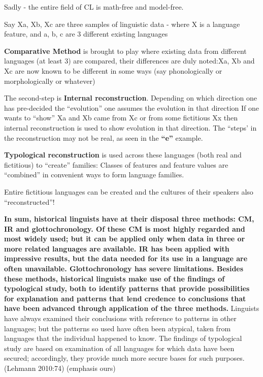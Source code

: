 Sadly - the entire field of CL is math-free and model-free.

Say Xa, Xb, Xc are three samples of linguistic data - where X is a language feature, and a, b, c are 3 different existing languages

\textbf{Comparative Method} is brought to play where existing data from different languages (at least 3) are compared, their differences are duly noted:Xa, Xb and Xc are now known to be different in some ways (say phonologically or morphologically or whatever)

The second-step is \textbf{Internal reconstruction}. Depending on which direction one has pre-decided the “evolution” one assumes the evolution in that direction If one wants to “show” Xa and Xb came from Xc or from some fictitious Xx then internal reconstruction is used to show evolution in that direction. The “steps’ in the reconstruction may not be real, as seen in the \textbf{“e”} example.

\textbf{Typological reconstruction} is used across these languages (both real and fictitious) to “create” families: Classes of features and feature values are “combined” in convenient ways to form language families.

Entire fictitious languages can be created and the cultures of their speakers also “reconstructed”!

\begin{myquote}
\textbf{In sum, historical linguists have at their disposal three methods: CM, IR and glottochronology. Of these CM is most highly regarded and most widely used; but it can be applied only when data in three or more related languages are available. IR has been applied with impressive results, but the data needed for its use in a language are often unavailable. Glottochronology has severe limitations. Besides these methods, historical linguists make use of the findings of typological study, both to identify patterns that provide possibilities for explanation and patterns that lend credence to conclusions that have been advanced through application of the three methods.} Linguists have always examined their conclusions with reference to patterns in other languages; but the patterns so used have often been atypical, taken from languages that the individual happened to know. The findings of typological study are based on examination of all languages for which data have been secured; accordingly, they provide much more secure bases for such purposes. (Lehmann 2010:74) (emphasis ours)
\end{myquote}

